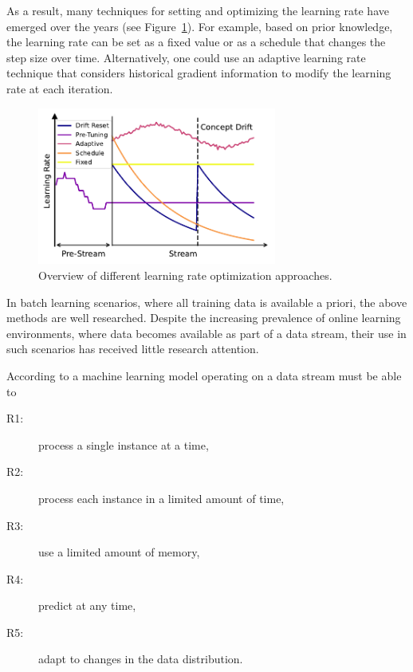 \documentclass[runningheads]{llncs}
\begin{document}
As a result, many techniques for setting and optimizing the learning rate have emerged over the years (see Figure~\ref{fig:lr_overview}).
For example, based on prior knowledge, the learning rate can be set as a fixed value or as a schedule that changes the step size over time.
Alternatively, one could use an adaptive learning rate technique that considers historical gradient information to modify the learning rate at each iteration.
\begin{figure}[ht]
	\centering
	\includegraphics[width=0.7\textwidth]{figures/lr_overview.pdf}
	\caption{Overview of different learning rate optimization approaches.}
	\label{fig:lr_overview}
\end{figure}
In batch learning scenarios, where all training data is available a priori, the above methods are well researched.
Despite the increasing prevalence of online learning environments, where data becomes available as part of a data stream, their use in such scenarios has received little research attention.

According to \textcite{bifetMOAMassiveOnline2010} a machine learning model operating on a data stream must be able to
\begin{center}
	\begin{description}
		\item[R1:] process a single instance at a time,\label{rq:single_instance}
		\item[R2:] process each instance in a limited amount of time,\label{rq:limited_time}
		\item[R3:] use a limited amount of memory,\label{rq:limited_memory}
		\item[R4:] predict at any time,\label{rq:predict_any_time}
		\item[R5:] adapt to changes in the data distribution.\label{rq:adapt_to_drift}
	\end{description}
\end{center}
\end{document}
